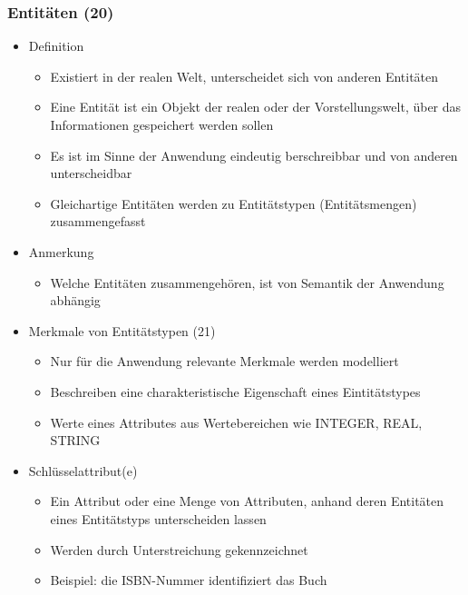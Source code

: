 \subsubsection{Entitäten (20)}
	\begin{itemize}
		\item Definition
		\begin{itemize}
			\item Existiert in der realen Welt, unterscheidet sich von anderen Entitäten
			\item Eine Entität ist ein Objekt der realen oder der Vorstellungswelt, über das Informationen gespeichert werden sollen
			\item Es ist im Sinne der Anwendung eindeutig berschreibbar und von anderen unterscheidbar
			\item Gleichartige Entitäten werden zu Entitätstypen (Entitätsmengen) zusammengefasst
		\end{itemize}
		\item Anmerkung
		\begin{itemize}
			\item Welche Entitäten zusammengehören, ist von Semantik der Anwendung abhängig
		\end{itemize}
		\item Merkmale von Entitätstypen (21)
		\begin{itemize}
			\item Nur für die Anwendung relevante Merkmale werden modelliert
			\item Beschreiben eine charakteristische Eigenschaft eines Eintitätstypes
			\item Werte eines Attributes aus Wertebereichen wie INTEGER, REAL, STRING
		\end{itemize}
		\item Schlüsselattribut(e)
		\begin{itemize}
			\item Ein Attribut oder eine Menge von Attributen, anhand deren Entitäten eines Entitätstyps unterscheiden lassen
			\item Werden durch Unterstreichung gekennzeichnet
			\item Beispiel: die ISBN-Nummer identifiziert das Buch
		\end{itemize}
		\end{itemize}
